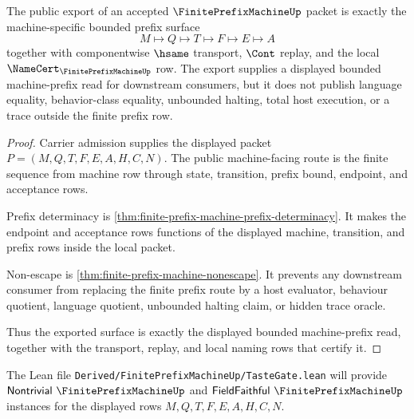 \begin{theorem}
\label{thm:finite-prefix-machine-public-export}
The public export of an accepted $\FinitePrefixMachineUp$ packet is exactly the machine-specific bounded prefix surface
$$
M \longmapsto Q \longmapsto T \longmapsto F \longmapsto E \longmapsto A
$$
together with componentwise $\hsame$ transport, $\Cont$ replay, and the local $\NameCert_{\FinitePrefixMachineUp}$ row. The export supplies a displayed bounded machine-prefix read for downstream consumers, but it does not publish language equality, behavior-class equality, unbounded halting, total host execution, or a trace outside the finite prefix row.
\end{theorem}
\begin{proof}
Carrier admission supplies the displayed packet $P=(M,Q,T,F,E,A,H,C,N)$. The public machine-facing route is the finite sequence from machine row through state, transition, prefix bound, endpoint, and acceptance rows.

Prefix determinacy is \autoref{thm:finite-prefix-machine-prefix-determinacy}. It makes the endpoint and acceptance rows functions of the displayed machine, transition, and prefix rows inside the local packet.

Non-escape is \autoref{thm:finite-prefix-machine-nonescape}. It prevents any downstream consumer from replacing the finite prefix route by a host evaluator, behaviour quotient, language quotient, unbounded halting claim, or hidden trace oracle.

Thus the exported surface is exactly the displayed bounded machine-prefix read, together with the transport, replay, and local naming rows that certify it.
\end{proof}

The Lean file \texttt{Derived/FinitePrefixMachineUp/TasteGate.lean} will provide $\mathsf{Nontrivial}\ \FinitePrefixMachineUp$ and $\mathsf{FieldFaithful}\ \FinitePrefixMachineUp$ instances for the displayed rows $M,Q,T,F,E,A,H,C,N$.

